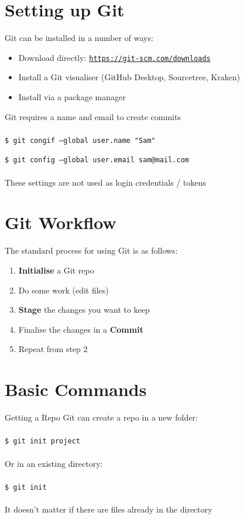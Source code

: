 \documentclass{beamer}
\begin{document}
\section{Setting up Git}
\begin{frame}[allowframebreaks]{\secname}
    Git can be installed in a number of ways:
    \begin{itemize}
        \item Download directly: {\tt \url{https://git-scm.com/downloads}}
        \item Install a Git visualiser (GitHub Desktop, Sourcetree, Kraken)
        \item Install via a package manager 
    \end{itemize}

\framebreak
    
    Git requires a name and email to create commits \\~\\

    {\tt \$ git congif --global user.name "Sam"} 

    {\tt \$ git config --global user.email sam@mail.com} \\~\\

    These settings are not used as login credentials / tokens
\end{frame}

\section{Git Workflow}
\begin{frame}{\secname}
    The standard process for using Git is as follows:    
    \begin{enumerate}
        \item {\bf Initialise} a Git repo
        \item Do some work (edit files)
        \item {\bf Stage} the changes you want to keep
        \item Finalise the changes in a {\bf Commit}
        \item Repeat from step 2
    \end{enumerate}
\end{frame}

\section{Basic Commands}
\begin{frame}{Getting a Repo}
    Git can create a repo in  a new folder:\\~\\
    {\tt \$ git init project} \\~\\
    Or in an existing directory: \\~\\
    {\tt \$ git init} \\~\\
    It doesn't matter if there are files already in the directory
\end{frame}
\end{document}
